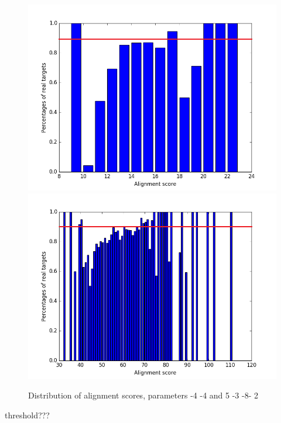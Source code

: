 \documentclass[12pt]{article}
\begin{document}
\begin{figure}
\centering
\includegraphics[scale=0.3]{results/plot_scores-4-4_thresh.png}
\includegraphics[scale=0.3]{results/plot_scores5-3-8-2_thresh.png}
\caption{Distribution of alignment scores, parameters -4 -4 and 5 -3 -8- 2}
\label{fig:distribution}
\end{figure}

threshold??? \\
\end{document}
